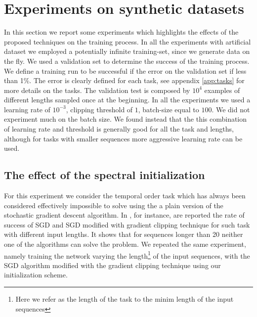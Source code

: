 \section{Experiments on synthetic datasets}
In this section we report some experiments which highlights the effects of the proposed techniques on the training process. In all the experiments with artificial dataset we employed a potentially infinite training-set, since we generate data on the fly. We used a validation set to determine the success of the training process. We define a training run to be successful if the error on the validation set if less than 1\%. The error is clearly defined for each task, see appendix \ref{app:tasks} for more details on the tasks. The validation test is composed by $10^4$ examples of different lengths sampled once at the beginning. In all the experiments we used a learning rate of $10^{-3}$, clipping threshold of $1$, batch-size equal to $100$. We did not experiment much on the batch size. We found instead that the this combination of learning rate and threshold is generally good for all the task and lengths, although for tasks with smaller sequences more aggressive learning rate can be used.

\subsection{The effect of the spectral initialization}

For this experiment we consider the temporal order task which has always been considered effectively impossible to solve using the a plain version of the stochastic  gradient descent algorithm.
In \cite{advancesInOptimizingRnns}, for instance, are reported the rate of success of SGD and SGD modified with gradient clipping technique for such task with different input lengths. It shows that for sequences longer than 20 neither one of the algorithms can solve the problem. We repeated the same experiment, namely training the network varying the length\footnote{Here we refer as the length of the task to the minim length of the input sequences} of the input sequences, with the SGD algorithm modified with the gradient clipping technique using our initialization scheme. 

